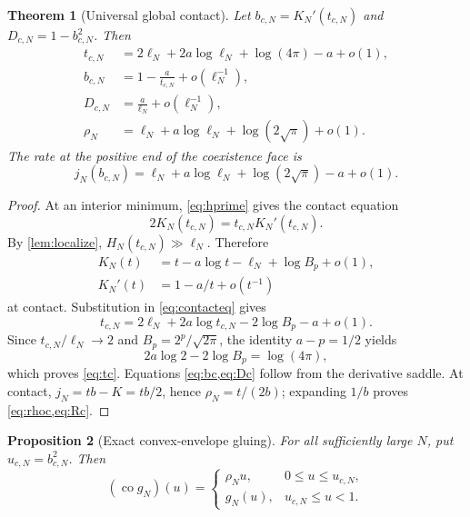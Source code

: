 \documentclass[11pt]{article}
\newtheorem{theorem}{Theorem}[section]
\newtheorem{proposition}[theorem]{Proposition}
\newcommand{\co}{\operatorname{co}}
\begin{document}
\begin{theorem}[Universal global contact]
\label{thm:contact}
Let $b_{c,N}=K_N'(t_{c,N})$ and
$D_{c,N}=1-b_{c,N}^2$.  Then
\begin{align}
 t_{c,N}
 &=2\ell_N+2a\log\ell_N+\log(4\pi)-a+o(1),             \label{eq:tc}\\
 b_{c,N}
 &=1-\frac{a}{t_{c,N}}+o(\ell_N^{-1}),                  \label{eq:bc}\\
 D_{c,N}
 &=\frac{a}{\ell_N}+o(\ell_N^{-1}),                     \label{eq:Dc}\\
 \rho_N
 &=\ell_N+a\log\ell_N+\log(2\sqrt\pi)+o(1).           \label{eq:rhoc}
\end{align}
The rate at the positive end of the coexistence face is
\[
 j_N(b_{c,N})
 =\ell_N+a\log\ell_N+\log(2\sqrt\pi)-a+o(1).           \label{eq:Rc}
\]
\end{theorem}

\begin{proof}
At an interior minimum, \cref{eq:hprime} gives the contact equation
\[
 2K_N(t_{c,N})=t_{c,N}K_N'(t_{c,N}).                    \label{eq:contacteq}
\]
By \cref{lem:localize}, $H_N(t_{c,N})\gg\ell_N$.  Therefore
\begin{align*}
 K_N(t)&=t-a\log t-\ell_N+\log B_p+o(1),\\
 K_N'(t)&=1-a/t+o(t^{-1})
\end{align*}
at contact.  Substitution in \cref{eq:contacteq} gives
\[
 t_{c,N}=2\ell_N+2a\log t_{c,N}-2\log B_p-a+o(1).
\]
Since $t_{c,N}/\ell_N\to2$ and
$B_p=2^p/\sqrt{2\pi}$, the identity $a-p=1/2$ yields
\[
 2a\log2-2\log B_p=\log(4\pi),
\]
which proves \cref{eq:tc}.  Equations
\cref{eq:bc,eq:Dc} follow from the derivative saddle.  At contact,
$j_N=tb-K=tb/2$, hence $\rho_N=t/(2b)$; expanding $1/b$ proves
\cref{eq:rhoc,eq:Rc}.
\end{proof}

\medskip
\begin{proposition}[Exact convex-envelope gluing]
\label{prop:gluing}
For all sufficiently large $N$, put $u_{c,N}=b_{c,N}^2$.  Then
\[
 (\co g_N)(u)=
 \begin{cases}
 \rho_Nu,&0\le u\le u_{c,N},\\
 g_N(u),&u_{c,N}\le u<1.
 \end{cases}                                             \label{eq:gluing}
\]
\end{proposition}
\end{document}
